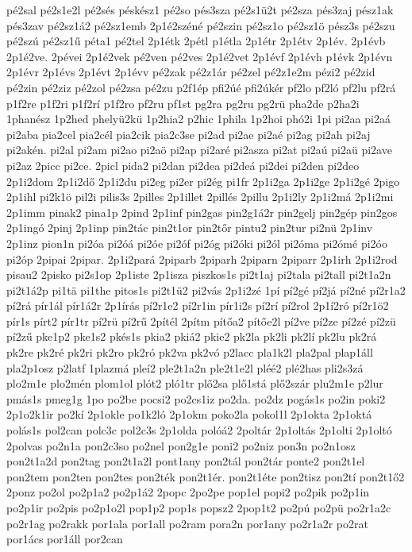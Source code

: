 {pé2sal
pé2s1e2l
pé2sés
péskész1
pé2so
pés3sza
pé2s1ü2t
pé2sza
pés3zaj
pész1ak
pés3zav
pé2sz1á2
pé2sz1emb
2p1é2széné
pé2szin
pé2sz1o
pé2sz1ö
pész3s
pé2szu
pé2szú
pé2sz1ű
péta1
pé2tel
2p1étk
2pétl
p1étla
2p1étr
2p1étv
2p1év.
2p1évb
2p1é2ve.
2pévei
2p1é2vek
pé2ven
pé2ves
2p1é2vet
2p1évf
2p1évh
p1évk
2p1évn
2p1évr
2p1évs
2p1évt
2p1évv
pé2zak
pé2z1ár
pé2zel
pé2z1e2m
pézi2
pé2zid
pé2zin
pé2ziz
pé2zol
pé2zsa
pé2zu
p2f1ép
pfi2úé
pfi2úkér
pf2lo
pf2ló
pf2lu
pf2rá
p1f2re
p1f2ri
p1f2rí
p1f2ro
pf2ru
pf1st
pg2ra
pg2ru
pg2rü
pha2de
p2ha2i
1phanész
1p2hed
phelyü2kü
1p2hia2
p2hic
1phila
1p2hoi
phó2i
1pi
pi2aa
pi2aá
pi2aba
pia2cel
pia2cél
pia2cik
pia2c3se
pi2ad
pi2ae
pi2aé
pi2ag
pi2ah
pi2aj
pi2akén.
pi2al
pi2am
pi2ao
pi2aö
pi2ap
pi2aré
pi2asza
pi2at
pi2aú
pi2aü
pi2ave
pi2az
2picc
pi2ce.
2picl
pida2
pi2dan
pi2dea
pi2deá
pi2dei
pi2den
pi2deo
2p1i2dom
2p1i2dő
2p1i2du
pi2eg
pi2er
pi2ég
pi1fr
2p1i2ga
2p1i2ge
2p1i2gé
2pigo
2p1ihl
pi2k1ö
pil2i
pilis3s
2pilles
2p1illet
2pillés
2pillu
2p1i2ly
2p1i2má
2p1i2mi
2p1imm
pinak2
pina1p
2pind
2p1inf
pin2gas
pin2g1á2r
pin2gelj
pin2gép
pin2gos
2p1ingó
2pinj
2p1inp
pin2tác
pin2t1or
pin2tőr
pintu2
pin2tur
pi2nü
2p1inv
2p1inz
pion1n
pi2óa
pi2óá
pi2óe
pi2óf
pi2óg
pi2óki
pi2ól
pi2óma
pi2ómé
pi2óo
pi2óp
2pipai
2pipar.
2p1i2pará
2piparb
2piparh
2piparn
2piparr
2p1irh
2p1i2rod
pisau2
2pisko
pi2s1op
2p1iste
2p1isza
piszkos1s
pi2t1aj
pi2tala
pi2tall
pi2t1a2n
pi2t1á2p
pi1tä
pi1the
pitos1s
pi2t1ü2
pi2vás
2p1i2zé
1pí
pí2gé
pí2já
pí2né
pí2r1a2
pí2rá
pír1ál
pír1á2r
2p1írás
pí2r1e2
pí2r1in
pír1i2s
pí2rí
pí2rol
2p1í2ró
pí2r1ö2
pír1s
pírt2
pír1tr
pí2rü
pí2rű
2pítél
2pítm
pítőa2
pítőe2l
pí2ve
pí2ze
pí2zé
pí2zü
pí2zű
pke1p2
pke1s2
pkés1s
pkia2
pkiá2
pkie2
pk2la
pk2li
pk2lí
pk2lu
pk2rá
pk2re
pk2ré
pk2ri
pk2ro
pk2ró
pk2va
pk2vó
p2lacc
pla1k2l
pla2pal
plap1áll
pla2p1osz
p2latf
1plazmá
pleí2
ple2t1a2n
ple2t1e2l
pléé2
plé2has
pli2s3zá
plo2m1e
plo2mén
plom1ol
plót2
pló1tr
plő2sa
plő1stá
plő2szár
plu2m1e
p2lur
pmás1s
pmeg1g
1po
po2be
pocsi2
po2cs1iz
po2da.
po2dz
pogás1s
po2in
poki2
2p1o2k1ir
po2kí
2p1okle
po1k2ló
2p1okm
poko2la
pokol1l
2p1okta
2p1oktá
polás1s
pol2can
polc3c
pol2c3s
2p1olda
polóá2
2poltár
2p1oltás
2p1olti
2p1oltó
2polvas
po2n1a
pon2c3so
po2nel
pon2g1e
poni2
po2niz
pon3n
po2n1osz
pon2t1a2d
pon2tag
pon2t1a2l
pont1any
pon2tál
pon2tár
ponte2
pon2t1el
pon2tem
pon2ten
pon2tes
pon2ték
pon2t1ér.
pon2t1éte
pon2tisz
pon2tí
pon2t1ő2
2ponz
po2ol
po2p1a2
po2p1á2
2popc
2po2pe
pop1el
popi2
po2pik
po2p1in
po2p1ir
po2pis
po2p1o2l
pop1p2
pop1s
popsz2
2pop1t2
po2pú
po2pü
po2r1a2c
po2r1ag
po2rakk
por1ala
por1all
po2ram
pora2n
por1any
po2r1a2r
po2rat
por1ács
por1áll
por2can
}
